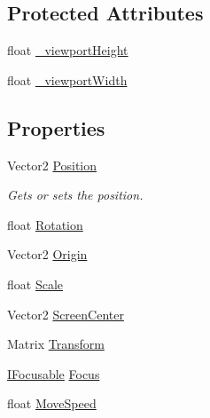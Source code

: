 \subsection*{Protected Attributes}
\begin{DoxyCompactItemize}
\item 
float \hyperlink{class_athena_engine_1_1_framework_1_1_camera2_d_a485bfef4ff5f718addc49d3eec88b0e7}{\-\_\-viewport\-Height}
\item 
float \hyperlink{class_athena_engine_1_1_framework_1_1_camera2_d_af7ec19f2874045d548709d58f8778dd9}{\-\_\-viewport\-Width}
\end{DoxyCompactItemize}
\subsection*{Properties}
\begin{DoxyCompactItemize}
\item 
Vector2 \hyperlink{class_athena_engine_1_1_framework_1_1_camera2_d_aaf39bcf56a3bd9c8eabdfd8032acda3b}{Position}
\begin{DoxyCompactList}\small\item\em Gets or sets the position. \end{DoxyCompactList}\item 
float \hyperlink{class_athena_engine_1_1_framework_1_1_camera2_d_a63df0638761ca57e15812d6ca118236a}{Rotation}
\item 
Vector2 \hyperlink{class_athena_engine_1_1_framework_1_1_camera2_d_ad9aebbc898c0b225e77a662b0bef7d35}{Origin}
\item 
float \hyperlink{class_athena_engine_1_1_framework_1_1_camera2_d_a253bc4fde9f95baeedc7e18b5633f62f}{Scale}
\item 
Vector2 \hyperlink{class_athena_engine_1_1_framework_1_1_camera2_d_a9ee30e517de34f7fb5d3675d28f2c9ce}{Screen\-Center}
\item 
Matrix \hyperlink{class_athena_engine_1_1_framework_1_1_camera2_d_a8cd757e58b30a4c4d57778ff2d1a79f2}{Transform}
\item 
\hyperlink{interface_athena_engine_1_1_framework_1_1_interfaces_1_1_i_focusable}{I\-Focusable} \hyperlink{class_athena_engine_1_1_framework_1_1_camera2_d_a2b2773d78bddeccbe6a01fb90fefecd5}{Focus}
\item 
float \hyperlink{class_athena_engine_1_1_framework_1_1_camera2_d_a5471ca8fa9dd3a511a4669ebb2db9784}{Move\-Speed}
\end{DoxyCompactItemize}


